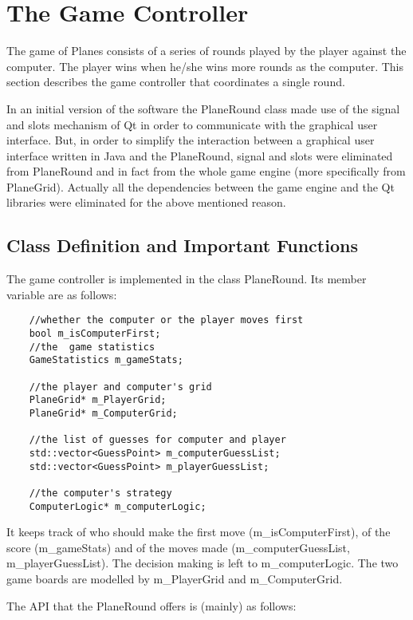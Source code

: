\section{The Game Controller}

The game of Planes consists of a series of rounds played by the player against the computer. The player wins when he/she wins more rounds as the computer. This section describes the game controller that coordinates a single round. 

In an initial version of the software the PlaneRound class made use of the signal and slots mechanism of Qt in order to communicate with the graphical user interface. But, in order to simplify the interaction between a graphical user interface written in Java and the PlaneRound, signal and slots were eliminated from PlaneRound and in fact from the whole game engine (more specifically from PlaneGrid). Actually all the dependencies between the game engine and the Qt libraries were eliminated for the above mentioned reason.

\subsection {Class Definition and Important Functions}

The game controller is implemented in the class PlaneRound. Its member variable are as follows:

\begin{lstlisting}
	//whether the computer or the player moves first
	bool m_isComputerFirst;
	//the  game statistics
	GameStatistics m_gameStats;
	
	//the player and computer's grid
	PlaneGrid* m_PlayerGrid;
	PlaneGrid* m_ComputerGrid;
	
	//the list of guesses for computer and player
	std::vector<GuessPoint> m_computerGuessList;
	std::vector<GuessPoint> m_playerGuessList;
	
	//the computer's strategy
	ComputerLogic* m_computerLogic;
\end{lstlisting}

It keeps track of who should make the first move (m\_isComputerFirst), of the score (m\_gameStats) and of the moves made (m\_computerGuessList, m\_playerGuessList). The decision making is left to m\_computerLogic. The two game boards are modelled by m\_PlayerGrid and m\_ComputerGrid.

The API that the PlaneRound offers is (mainly) as follows:

